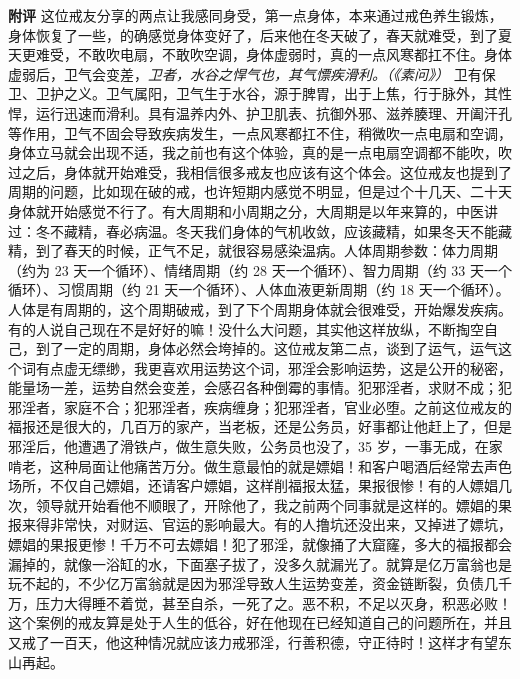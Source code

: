 \begin{case}
    \textbf{附评} 这位戒友分享的两点让我感同身受，第一点身体，本来通过戒色养生锻炼，身体恢复了一些，的确感觉身体变好了，后来他在冬天破了，春天就难受，到了夏天更难受，不敢吹电扇，不敢吹空调，身体虚弱时，真的一点风寒都扛不住。身体虚弱后，卫气会变差，\textit{卫者，水谷之悍气也，其气慓疾滑利。（《素问》）} 卫有保卫、卫护之义。卫气属阳，卫气生于水谷，源于脾胃，出于上焦，行于脉外，其性悍，运行迅速而滑利。具有温养内外、护卫肌表、抗御外邪、滋养腠理、开阖汗孔等作用，卫气不固会导致疾病发生，一点风寒都扛不住，稍微吹一点电扇和空调，身体立马就会出现不适，我之前也有这个体验，真的是一点电扇空调都不能吹，吹过之后，身体就开始难受，我相信很多戒友也应该有这个体会。这位戒友也提到了周期的问题，比如现在破的戒，也许短期内感觉不明显，但是过个十几天、二十天身体就开始感觉不行了。有大周期和小周期之分，大周期是以年来算的，中医讲过：冬不藏精，春必病温。冬天我们身体的气机收敛，应该藏精，如果冬天不能藏精，到了春天的时候，正气不足，就很容易感染温病。人体周期参数：体力周期（约为 23 天一个循环）、情绪周期（约 28 天一个循环）、智力周期（约 33 天一个循环）、习惯周期（约 21 天一个循环）、人体血液更新周期（约 18 天一个循环）。人体是有周期的，这个周期破戒，到了下个周期身体就会很难受，开始爆发疾病。有的人说自己现在不是好好的嘛！没什么大问题，其实他这样放纵，不断掏空自己，到了一定的周期，身体必然会垮掉的。这位戒友第二点，谈到了运气，运气这个词有点虚无缥缈，我更喜欢用运势这个词，邪淫会影响运势，这是公开的秘密，能量场一差，运势自然会变差，会感召各种倒霉的事情。犯邪淫者，求财不成；犯邪淫者，家庭不合；犯邪淫者，疾病缠身；犯邪淫者，官业必堕。之前这位戒友的福报还是很大的，几百万的家产，当老板，还是公务员，好事都让他赶上了，但是邪淫后，他遭遇了滑铁卢，做生意失败，公务员也没了，35 岁，一事无成，在家啃老，这种局面让他痛苦万分。做生意最怕的就是嫖娼！和客户喝酒后经常去声色场所，不仅自己嫖娼，还请客户嫖娼，这样削福报太猛，果报很惨！有的人嫖娼几次，领导就开始看他不顺眼了，开除他了，我之前两个同事就是这样的。嫖娼的果报来得非常快，对财运、官运的影响最大。有的人撸坑还没出来，又掉进了嫖坑，嫖娼的果报更惨！千万不可去嫖娼！犯了邪淫，就像捅了大窟窿，多大的福报都会漏掉的，就像一浴缸的水，下面塞子拔了，没多久就漏光了。就算是亿万富翁也是玩不起的，不少亿万富翁就是因为邪淫导致人生运势变差，资金链断裂，负债几千万，压力大得睡不着觉，甚至自杀，一死了之。恶不积，不足以灭身，积恶必败！这个案例的戒友算是处于人生的低谷，好在他现在已经知道自己的问题所在，并且又戒了一百天，他这种情况就应该力戒邪淫，行善积德，守正待时！这样才有望东山再起。
\end{case}

